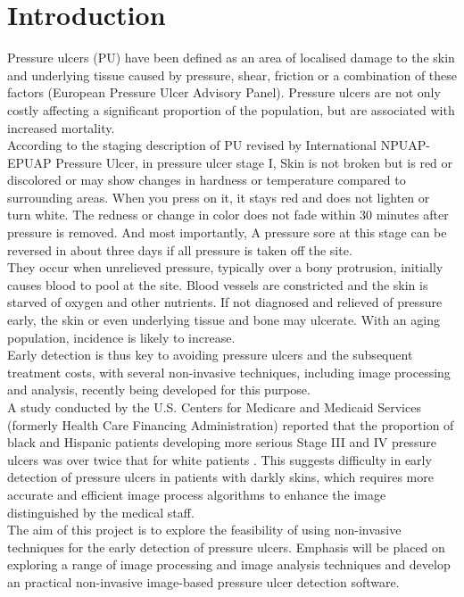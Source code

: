 \chapter{Introduction}
Pressure ulcers (PU) have been defined as an area of localised damage to the skin
and underlying tissue caused by pressure, shear, friction or a combination of these
factors (European Pressure Ulcer Advisory Panel). Pressure ulcers are not only costly affecting a significant proportion of the population, but are associated with increased mortality.\\

According to the staging description of PU revised by International NPUAP- EPUAP Pressure Ulcer, in pressure ulcer stage I, Skin is not broken but is red or discolored or may show changes in hardness or temperature compared to surrounding areas. When you press on it, it stays red and does not lighten or turn white. The redness or change in color does not fade within 30 minutes after pressure is removed. And most importantly, A pressure sore at this stage can be reversed in about three days if all pressure is taken off the site.\\

They occur when unrelieved pressure, typically over a bony protrusion, initially causes blood to pool at the site. Blood vessels are constricted and the skin is starved of oxygen and other nutrients. If not diagnosed and relieved of pressure early, the skin or even underlying tissue and bone may ulcerate. With an aging population, incidence is
likely to increase.\\

Early detection is thus key to avoiding pressure ulcers and the subsequent treatment costs, with several non-invasive techniques, including image processing and analysis, recently being developed for this purpose.\\

A study conducted by the U.S. Centers for Medicare and Medicaid Services (formerly Health Care Financing Administration) reported that the proportion of black and Hispanic patients developing more serious Stage III and IV pressure ulcers was over twice that for white
patients \cite{Lyder}. This suggests difficulty in early detection of pressure ulcers in patients with darkly skins, which requires more accurate and efficient image process algorithms to enhance the image distinguished by the medical staff.\\

The aim of this project is to explore the feasibility of using non-invasive techniques for the early detection of pressure ulcers. Emphasis will be placed on exploring a range of image processing and image analysis techniques and develop an practical non-invasive image-based pressure ulcer detection software.
